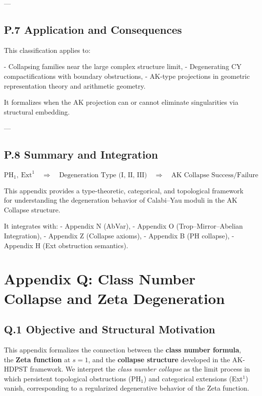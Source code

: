 \documentclass[11pt]{article}
\begin{document}
\begin{axiom}
\begin{axiom}
{{---

\subsection*{P.7 Application and Consequences}

This classification applies to:

- Collapsing families near the large complex structure limit,
- Degenerating CY compactifications with boundary obstructions,
- AK-type projections in geometric representation theory and arithmetic geometry.

It formalizes when the AK projection can or cannot eliminate singularities via structural embedding.

---

\subsection*{P.8 Summary and Integration}

\[
\boxed{
\mathrm{PH}_1,\ \mathrm{Ext}^1 \quad \Rightarrow \quad \text{Degeneration Type (I, II, III)} \quad \Rightarrow \quad \text{AK Collapse Success/Failure}
}
\]

This appendix provides a type-theoretic, categorical, and topological framework  
for understanding the degeneration behavior of Calabi–Yau moduli in the AK Collapse structure.

It integrates with:
- Appendix N (AbVar),
- Appendix O (Trop–Mirror–Abelian Integration),
- Appendix Z (Collapse axioms),
- Appendix B (PH collapse),
- Appendix H (Ext obstruction semantics).




\section*{Appendix Q: Class Number Collapse and Zeta Degeneration}

\subsection*{Q.1 Objective and Structural Motivation}

This appendix formalizes the connection between the \textbf{class number formula}, the \textbf{Zeta function} at $s = 1$, and the \textbf{collapse structure} developed in the AK-HDPST framework.  
We interpret the \emph{class number collapse} as the limit process in which persistent topological obstructions (PH$_1$) and categorical extensions (Ext$^1$) vanish, corresponding to a regularized degenerative behavior of the Zeta function.

}}
\end{axiom}
\end{axiom}
\end{document}
